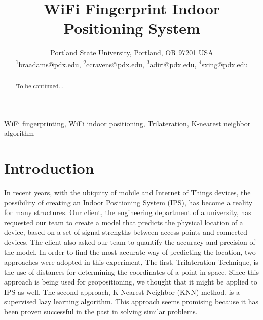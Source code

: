 \documentclass[12pt, conference]{IEEEtran}
\begin{document}
\title{WiFi Fingerprint Indoor Positioning System}

\author{
  {Portland State University, Portland, OR 97201 USA} \\
  \textsuperscript{1}braadams@pdx.edu, \textsuperscript{2}ccravens@pdx.edu, \textsuperscript{3}adiri@pdx.edu, \textsuperscript{4}sxing@pdx.edu
}

\maketitle



\begin{abstract}
  To be continued...
\end{abstract}

\begin{IEEEkeywords}
  WiFi fingerprinting, WiFi indoor positioning, Trilateration, K-nearest neighbor algorithm
\end{IEEEkeywords}


\section{Introduction}
In recent years, with the ubiquity of mobile and Internet of Things devices, the possibility of creating an Indoor Positioning System (IPS), has become a reality for many structures. Our client, the engineering department of a university, has requested our team to create a model that predicts the physical location of a device, based on a set of signal strengths between access points and connected devices. The client also asked our team to quantify the accuracy and precision of the model. In order to find the most accurate way of predicting the location, two approaches were adopted in this experiment, The first, Trilateration Technique, is the use of distances for determining the coordinates of a point in space. Since this approach is being used for geopositioning, we thought that it might be applied to IPS as well. The second approach, K-Nearest Neighbor (KNN) method, is a supervised lazy learning algorithm. This approach seems promising because it has been proven successful in the past in solving similar problems.
\end{document}
